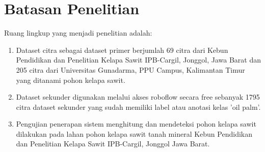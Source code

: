 \section{Batasan Penelitian}
\label{sec:2-BatasanMasalah}
\hspace{1,2cm}Ruang lingkup yang menjadi penelitian adalah:
\begin{enumerate}
	\item Dataset citra sebagai dataset primer berjumlah 69 citra dari Kebun Pendidikan dan Penelitian Kelapa Sawit IPB-Cargil, Jonggol, Jawa Barat dan 205 citra dari Universitas Gunadarma, PPU Campus, Kalimantan Timur yang ditanami pohon kelapa sawit.
	\item Dataset sekunder digunakan melalui akses roboflow secara free sebanyak 1795 citra dataset sekunder yang sudah memiliki label atau anotasi kelas 'oil palm'.
	\item Pengujian penerapan sistem menghitung dan mendeteksi pohon kelapa sawit dilakukan pada lahan pohon kelapa sawit tanah mineral Kebun Pendidikan dan Penelitian Kelapa Sawit IPB-Cargil, Jonggol Jawa Barat.
\end{enumerate}


